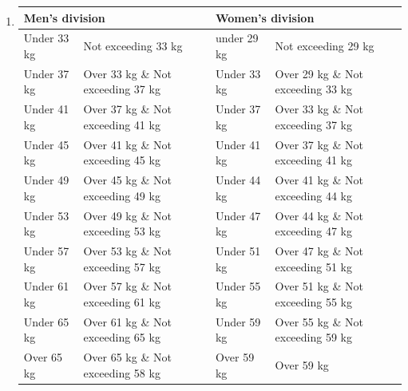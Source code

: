 \documentclass[draft]{report}
\begin{document}
\begin{enumerate}
\item


\begin{center}
\begin{tabular}{ |l|l|l|l| } 
 \hline
 \multicolumn{2}{|l|}{Men's division} & \multicolumn{2}{|l|}{Women's division}  \\
 \hline
 Under 33 kg & Not exceeding 33 kg & under 29 kg & Not exceeding 29 kg \\
 \hline
 Under 37 kg & Over 33 kg \& Not exceeding 37 kg & Under 33 kg & Over 29 kg \& Not exceeding 33 kg \\
 \hline                                                                                        
 Under 41 kg & Over 37 kg \& Not exceeding 41 kg & Under 37 kg & Over 33 kg \& Not exceeding 37 kg \\
 \hline                                                                                        
 Under 45 kg & Over 41 kg \& Not exceeding 45 kg & Under 41 kg & Over 37 kg \& Not exceeding 41 kg \\
 \hline                                                                                        
 Under 49 kg & Over 45 kg \& Not exceeding 49 kg & Under 44 kg & Over 41 kg \& Not exceeding 44 kg \\
 \hline                                                                                        
 Under 53 kg & Over 49 kg \& Not exceeding 53 kg & Under 47 kg & Over 44 kg \& Not exceeding 47 kg \\
 \hline                                                                                        
 Under 57 kg & Over 53 kg \& Not exceeding 57 kg & Under 51 kg & Over 47 kg \& Not exceeding 51 kg \\
 \hline                                                                                        
 Under 61 kg & Over 57 kg \& Not exceeding 61 kg & Under 55 kg & Over 51 kg \& Not exceeding 55 kg \\
 \hline                                                                                        
 Under 65 kg & Over 61 kg \& Not exceeding 65 kg & Under 59 kg & Over 55 kg \& Not exceeding 59 kg \\
 \hline
 Over 65 kg & Over 65 kg \& Not exceeding 58 kg & Over 59 kg & Over 59 kg \\
 \hline
\end{tabular}
\end{center}

  \begin{enumerate}
  \begin{samepage}
  \item
  


\end{samepage}
\end{enumerate}
\end{enumerate}
\end{document}
